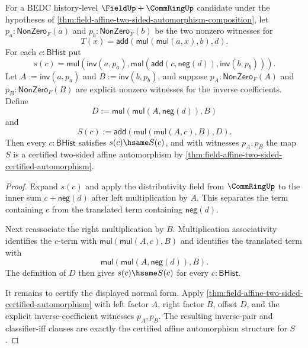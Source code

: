\begin{theorem}
\label{thm:field-affine-inverse-is-certified-affine}
For a BEDC history-level $\FieldUp+\CommRingUp$ candidate under the hypotheses
of \autoref{thm:field-affine-two-sided-automorphism-composition}, let
$p_a:\mathsf{NonZero}_F(a)$ and $p_b:\mathsf{NonZero}_F(b)$ be the two
nonzero witnesses for
$$
T(x)=\mathsf{add}(\mathsf{mul}(\mathsf{mul}(a,x),b),d).
$$
For each $c:\mathsf{BHist}$ put
$$
s(c)=
\mathsf{mul}(\mathsf{inv}(a,p_a),
\mathsf{mul}(\mathsf{add}(c,\mathsf{neg}(d)),\mathsf{inv}(b,p_b))).
$$
Let
$A:=\mathsf{inv}(a,p_a)$ and $B:=\mathsf{inv}(b,p_b)$, and suppose
$p_A:\mathsf{NonZero}_F(A)$ and $p_B:\mathsf{NonZero}_F(B)$ are explicit
nonzero witnesses for the inverse coefficients. Define
$$
D:=\mathsf{mul}(\mathsf{mul}(A,\mathsf{neg}(d)),B)
$$
and
$$
S(c):=\mathsf{add}(\mathsf{mul}(\mathsf{mul}(A,c),B),D).
$$
Then every $c:\mathsf{BHist}$ satisfies $s(c)\hsame S(c)$, and with witnesses
$p_A,p_B$ the map $S$ is a certified two-sided affine automorphism by
\autoref{thm:field-affine-two-sided-certified-automorphism}.
\end{theorem}
\begin{proof}
Expand $s(c)$ and apply the distributivity field from $\CommRingUp$ to the
inner sum $c+\mathsf{neg}(d)$ after left multiplication by $A$. This separates
the term containing $c$ from the translated term containing $\mathsf{neg}(d)$.

Next reassociate the right multiplication by $B$. Multiplication associativity
identifies the $c$-term with $\mathsf{mul}(\mathsf{mul}(A,c),B)$ and identifies
the translated term with
$$
\mathsf{mul}(\mathsf{mul}(A,\mathsf{neg}(d)),B).
$$
The definition of $D$ then gives $s(c)\hsame S(c)$ for every
$c:\mathsf{BHist}$.

It remains to certify the displayed normal form. Apply
\autoref{thm:field-affine-two-sided-certified-automorphism} with left factor
$A$, right factor $B$, offset $D$, and the explicit inverse-coefficient
witnesses $p_A,p_B$. The resulting inverse-pair and classifier-iff clauses are
exactly the certified affine automorphism structure for $S$.
\end{proof}

